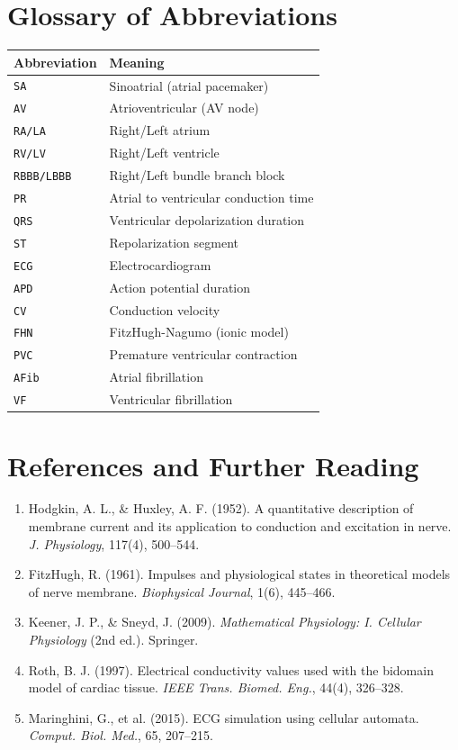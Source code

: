 \documentclass[12pt,a4paper,oneside]{book}
\begin{document}
\section{Glossary of Abbreviations}

\begin{tabular}{|l|l|}
\hline
\textbf{Abbreviation} & \textbf{Meaning} \\
\hline
\texttt{SA} & Sinoatrial (atrial pacemaker) \\
\texttt{AV} & Atrioventricular (AV node) \\
\texttt{RA/LA} & Right/Left atrium \\
\texttt{RV/LV} & Right/Left ventricle \\
\texttt{RBBB/LBBB} & Right/Left bundle branch block \\
\texttt{PR} & Atrial to ventricular conduction time \\
\texttt{QRS} & Ventricular depolarization duration \\
\texttt{ST} & Repolarization segment \\
\texttt{ECG} & Electrocardiogram \\
\texttt{APD} & Action potential duration \\
\texttt{CV} & Conduction velocity \\
\texttt{FHN} & FitzHugh-Nagumo (ionic model) \\
\texttt{PVC} & Premature ventricular contraction \\
\texttt{AFib} & Atrial fibrillation \\
\texttt{VF} & Ventricular fibrillation \\
\hline
\end{tabular}

\section{References and Further Reading}

\begin{enumerate}
    \item Hodgkin, A. L., \& Huxley, A. F. (1952). A quantitative description of membrane current and its application to conduction and excitation in nerve. \textit{J. Physiology}, 117(4), 500--544.
    
    \item FitzHugh, R. (1961). Impulses and physiological states in theoretical models of nerve membrane. \textit{Biophysical Journal}, 1(6), 445--466.
    
    \item Keener, J. P., \& Sneyd, J. (2009). \textit{Mathematical Physiology: I. Cellular Physiology} (2nd ed.). Springer.
    
    \item Roth, B. J. (1997). Electrical conductivity values used with the bidomain model of cardiac tissue. \textit{IEEE Trans. Biomed. Eng.}, 44(4), 326--328.
    
    \item Maringhini, G., et al. (2015). ECG simulation using cellular automata. \textit{Comput. Biol. Med.}, 65, 207--215.
\end{enumerate}
\end{document}
